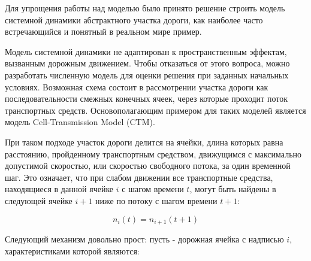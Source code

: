Для упрощения работы над моделью было принято решение строить модель системной динамики абстрактного участка дороги, как наиболее часто встречающийся и понятный в реальном мире пример. 


Модель системной динамики не адаптирован к пространственным эффектам, вызванным дорожным движением. Чтобы отказаться от этого вопроса, можно разработать численную модель для оценки решения при заданных начальных условиях. Возможная схема состоит в рассмотрении участка дороги как последовательности смежных конечных ячеек, через которые проходит поток транспортных средств. Основополагающим примером для таких моделей является модель Cell-Transmission Model (CTM).


При таком подходе участок дороги делится на ячейки, длина которых равна расстоянию, пройденному транспортным средством, движущимся с максимально допустимой скоростью, или скоростью свободного потока, за один временной шаг. Это означает, что при слабом движении все транспортные средства, находящиеся в данной ячейке $i$ с шагом времени $t$, могут быть найдены в следующей ячейке $i+1$ ниже по потоку с шагом времени $t+1$:

\begin{equation}
    n_i(t) = n_{i+1}(t+1)
\end{equation}



Следующий механизм довольно прост: пусть - дорожная ячейка с надписью $i$, характеристиками которой являются:


